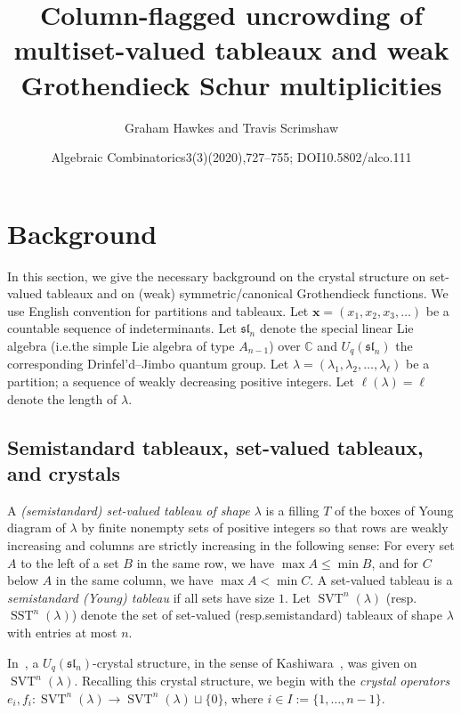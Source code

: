 \documentclass[10pt]{amsart}
\title[Column-flagged uncrowding]{Column-flagged uncrowding of multiset-valued tableaux and weak Grothendieck Schur multiplicities}
\author{Graham Hawkes and Travis Scrimshaw}
\date{Algebraic Combinatorics3(3)(2020),727–755; DOI10.5802/alco.111}
\theoremstyle{definition}
\providecommand{\ie}{i.e.}
\providecommand{\resp}{resp.}
\newcommand{\xx}{\mathbf{x}}
\newcommand{\fsl}{\mathfrak{sl}}
\DeclareMathOperator{\ssyt}{SST} %
\DeclareMathOperator{\svt}{SVT} %
\newcommand{\CC}{\mathbb{C}}
\newcommand{\defn}[1]{{\color{darkred}\emph{#1}}} %
\begin{document}
\maketitle
\setcounter{section}{1}
\section{Background}
\label{sec:background}

In this section, we give the necessary background on the crystal structure on set-valued tableaux and on (weak) symmetric/canonical Grothendieck functions.
We use English convention for partitions and tableaux.
Let $\xx = (x_1, x_2, x_3, \ldots)$ be a countable sequence of indeterminants.
Let $\fsl_n$ denote the special linear Lie algebra (\ie the simple Lie algebra of type $A_{n-1}$) over $\CC$ and $U_q(\fsl_n)$ the corresponding Drinfel'd--Jimbo quantum group.
Let $\lambda = (\lambda_1, \lambda_2, \dotsc, \lambda_{\ell})$ be a partition; a sequence of weakly decreasing positive integers.
Let $\ell(\lambda) = \ell$ denote the length of $\lambda$.

\subsection{Semistandard tableaux, set-valued tableaux, and crystals}

A \defn{(semistandard) set-valued tableau of shape $\lambda$} is a filling $T$ of the boxes of Young diagram of $\lambda$ by finite nonempty sets of positive integers so that rows are weakly increasing and columns are strictly increasing in the following sense:
For every set $A$ to the left of a set $B$ in the same row, we have $\max A \leq \min B$, and for $C$ below $A$ in the same column, we have $\max A < \min C$.
A set-valued tableau is a \defn{semistandard (Young) tableau} if all sets have size $1$.
Let $\svt^n(\lambda)$ (\resp $\ssyt^n(\lambda)$) denote the set of set-valued (\resp semistandard) tableaux of shape $\lambda$ with entries at most $n$.

In~\cite{MPS18}, a $U_q(\fsl_n)$-crystal structure, in the sense of Kashiwara~\cite{K90,K91}, was given on $\svt^n(\lambda)$.
Recalling this crystal structure, we begin with the \defn{crystal operators} $e_i, f_i \colon \svt^n(\lambda) \to \svt^n(\lambda) \sqcup \{0\}$, where $i \in I := \{1, \dotsc, n-1\}$.
\end{document}
